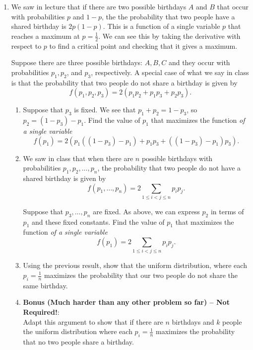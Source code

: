 \documentclass[11pt]{article}
\begin{document}
\begin{enumerate}

\item We saw in lecture that if there are two possible birthdays $A$ and $B$  that occur with probabilities $p$ and $1-p$, the the probability that two people have a shared birthday is $2 p(1-p)$.  This is a function of a single variable $p$ that reaches a maximum at $p = \frac{1}{2}$.  We can see this by taking the derivative with respect to $p$ to find a critical point and checking that it gives a maximum.

Suppose there are three possible birthdays: $A,B,C$ and they occur with probabilities $p_1, p_2$, and $p_3$, respectively.  A special case of what we say in class is that the probability that two people do not share a birthday is given by
\[
f(p_1, p_2, p_3) = 2\left(p_1 p_2 + p_1 p_3 + p_2 p_3\right).
\]
\begin{enumerate}
\item Suppose that $p_3$ is fixed.  We see that $p_1 + p_2 = 1-p_3$, so $p_2 = (1-p_3) - p_1$.  Find the value of $p_1$ that maximizes the function \emph{of a single variable}
\[
f(p_1) = 2 \left(p_1 ((1-p_3) - p_1) + p_1 p_3 + ((1-p_3) - p_1) p_3\right).
\]

\item We saw in class that when there are $n$ possible birthdays with probabilities $p_1,p_2,\ldots, p_n$, the probability that two people do not have a shared birthday is given by
\[
f(p_1,\ldots, p_n) = 2 \sum_{1\le i < j \le n} p_i p_j.
\]

Suppose that $p_3,\ldots, p_n$ are fixed.  As above, we can express $p_2$ in terms of $p_1$ and these fixed constants.  Find the value of $p_1$ that maximizes the function \emph{of a single variable}
\[
f(p_1) = 2 \sum_{1\le i < j \le n} p_i p_j.
\]

\item Using the previous result, show that the uniform distribution, where each $p_i = \frac{1}{n}$ maximizes the probability that our two people do not share the same birthday.

\item {\bf Bonus (Much harder than any other problem so far) -- Not Required!}: \\
Adapt this argument to show that if there are $n$ birthdays and $k$ people the uniform distribution where each $p_i = \frac{1}{n}$ maximizes the probability that no two people share a birthday.

\end{enumerate}


\end{enumerate}
\end{document}
